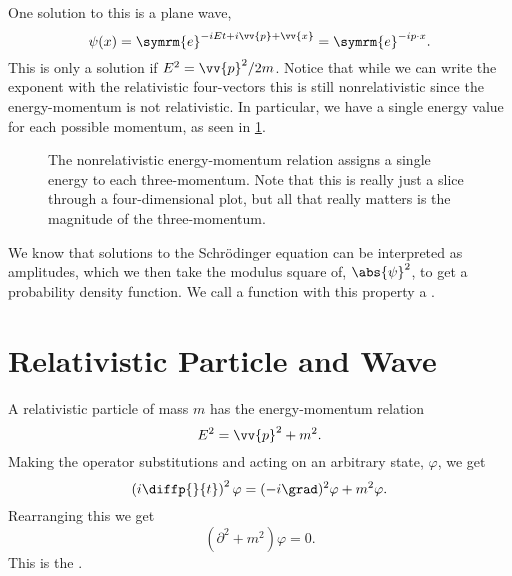 \documentclass[fleqn]{NotesClass}
\newcommand{\dalembertian}{\partial^2}
\newcommand{\e}{\symrm{e}}
\begin{document}
    One solution to this is a plane wave,
    \begin{equation}
        \psi(x) = \e^{-iEt + i\vv{p} + \vv{x}} = \e^{-ip\cdot x}.
    \end{equation}
    This is only a solution if \(E^2 = \vv{p}^2/2m\).
    Notice that while we can write the exponent with the relativistic four-vectors this is still nonrelativistic since the energy-momentum is not relativistic.
    In particular, we have a single energy value for each possible momentum, as seen in \cref{fig:energy-momentum relation nonrelativistic}.
    
    \begin{figure}
        \caption[Nonrelativistic energy-momentum relation.]{The nonrelativistic energy-momentum relation assigns a single energy to each three-momentum. Note that this is really just a slice through a four-dimensional plot, but all that really matters is the magnitude of the three-momentum.}
        \label{fig:energy-momentum relation nonrelativistic}
    \end{figure}
    
    We know that solutions to the Schrödinger equation can be interpreted as amplitudes, which we then take the modulus square of, \(\abs{\psi}^2\), to get a probability density function.
    We call a function with this property a .
    
    \section{Relativistic Particle and Wave}
    A relativistic particle of mass \(m\) has the energy-momentum relation
    \begin{equation}
        E^2 = \vv{p}^2 + m^2.
    \end{equation}
    Making the operator substitutions and acting on an arbitrary state, \(\varphi\), we get
    \begin{equation}
        \left( i\diffp{}{t} \right)^2\varphi = (-i\grad)^2\varphi + m^2\varphi.
    \end{equation}
    Rearranging this we get
    \begin{equation}
        (\dalembertian + m^2)\varphi = 0.
    \end{equation}
    This is the .
    
\end{document}
